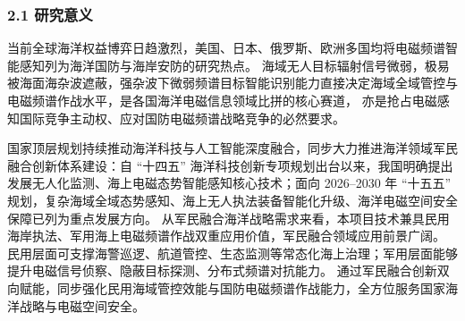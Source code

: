 \subsubsection{2.1 研究意义}

当前全球海洋权益博弈日趋激烈，美国、日本、俄罗斯、欧洲多国均将电磁频谱智能感知列为海洋国防与海岸安防的研究热点。
海域无人目标辐射信号微弱，极易被海面海杂波遮蔽，强杂波下微弱频谱目标智能识别能力直接决定海域全域管控与电磁频谱作战水平，是各国海洋电磁信息领域比拼的核心赛道，
亦是抢占电磁感知国际竞争主动权、应对国防电磁频谱战略竞争的必然要求。

国家顶层规划持续推动海洋科技与人工智能深度融合，同步大力推进海洋领域军民融合创新体系建设：自 “十四五” 海洋科技创新专项规划出台以来，我国明确提出发展无人化监测、海上电磁态势智能感知核心技术；面向 2026--2030 年 “十五五” 规划，复杂海域全域态势感知、海上无人执法装备智能化升级、海洋电磁空间安全保障已列为重点发展方向。
从军民融合海洋战略需求来看，本项目技术兼具民用海岸执法、军用海上电磁频谱作战双重应用价值，军民融合领域应用前景广阔。
民用层面可支撑海警巡逻、航道管控、生态监测等常态化海上治理；军用层面能够提升电磁信号侦察、隐蔽目标探测、分布式频谱对抗能力。
通过军民融合创新双向赋能，同步强化民用海域管控效能与国防电磁频谱作战能力，全方位服务国家海洋战略与电磁空间安全。

